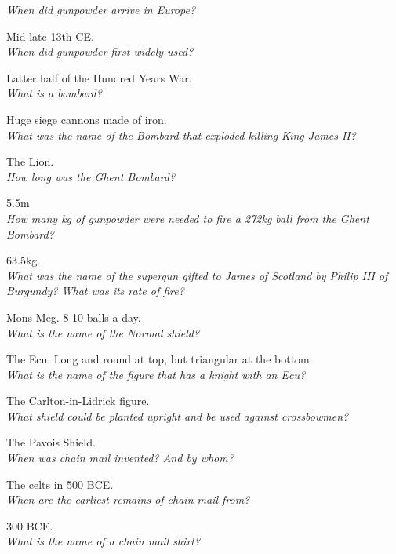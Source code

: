 \documentclass[12pt]{article}
\begin{document}
\textit{When did gunpowder arrive in Europe?}

Mid-late 13th CE.\\

\textit{When did gunpowder first widely used?}

Latter half of the Hundred Years War.\\

\textit{What is a bombard?}

Huge siege cannons made of iron.\\

\textit{What was the name of the Bombard that exploded killing King James II?}

The Lion.\\

\textit{How long was the Ghent Bombard?}

5.5m\\

\textit{How many kg of gunpowder were needed to fire a 272kg ball from the Ghent Bombard?}

63.5kg.\\

\textit{What was the name of the supergun gifted to James of Scotland by Philip III of Burgundy? What was its rate of fire?}

Mons Meg. 8-10 balls a day.\\

\textit{What is the name of the Normal shield?}

The Ecu. Long and round at top, but triangular at the bottom.\\

\textit{What is the name of the figure that has a knight with an Ecu?}

The Carlton-in-Lidrick figure.\\

\textit{What shield could be planted upright and be used against crossbowmen?}

The Pavois Shield.\\

\textit{When was chain mail invented? And by whom?}

The celts in 500 BCE.\\

\textit{When are the earliest remains of chain mail from?}

300 BCE.\\

\textit{What is the name of a chain mail shirt?}
\end{document}

